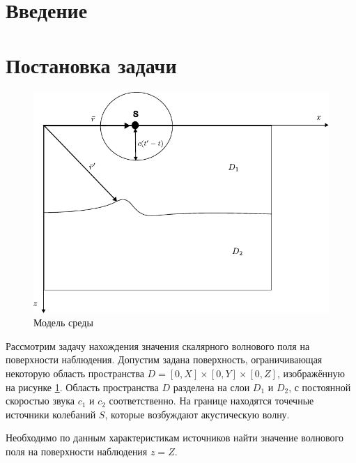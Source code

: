 \documentclass[a4paper, fontsize=14pt]{article} \usepackage{course_work}
\begin{document}
  \newpage \tableofcontents
	\newpage \section*{Введение} 
	
	
	\newpage 
	\section{Постановка задачи} 
	\begin{figure}[h]
		
		\centering
		\includegraphics{migration_fig.pdf}

		\caption{Модель среды}
		\label{fig:mig}
	\end{figure}
 	Рассмотрим задачу нахождения значения скалярного волнового поля на поверхности наблюдения.
 	Допустим задана поверхность, ограничивающая некоторую область пространства $D=[0,X]\times [0,Y]\times [0,Z]$, изображённую на рисунке \ref{fig:mig}.
 	Область пространства $D$ разделена на слои $D_1$ и $D_2$, с постоянной скоростью звука $c_1$ и $c_2$ соответственно.
 	На границе находятся точечные источники колебаний $S$, которые возбуждают акустическую волну.
 	
 	Необходимо по данным характеристикам источников найти значение волнового поля на поверхности наблюдения $z=Z$.
	
\end{document}
